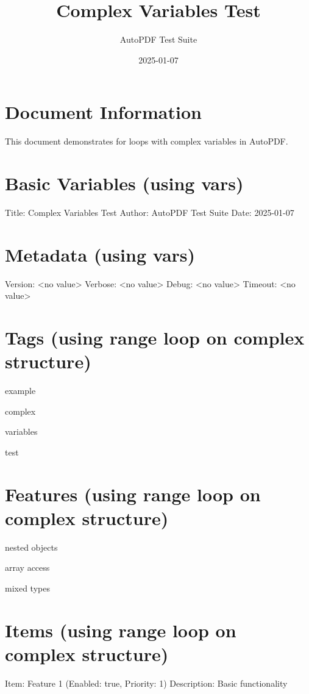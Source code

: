 \documentclass{article}
\title{Complex Variables Test}
\author{AutoPDF Test Suite}
\date{2025-01-07}
\begin{document}
\maketitle

\section{Document Information}
This document demonstrates for loops with complex variables in AutoPDF.

\section{Basic Variables (using vars)}
Title: Complex Variables Test
Author: AutoPDF Test Suite
Date: 2025-01-07

\section{Metadata (using vars)}
Version: <no value>
Verbose: <no value>
Debug: <no value>
Timeout: <no value>

\section{Tags (using range loop on complex structure)}

example\par

complex\par

variables\par

test\par


\section{Features (using range loop on complex structure)}

nested objects\par

array access\par

mixed types\par


\section{Items (using range loop on complex structure)}

Item: Feature 1 (Enabled: true, Priority: 1)
Description: Basic functionality\par
\end{document}
